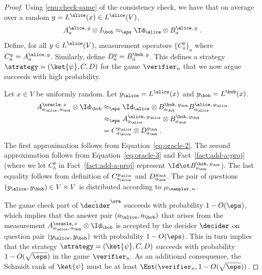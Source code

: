 \begin{proof}
  Using \cref{enu:check-same} of the consistency check, we have that on
  average over a random $y = L^\alice(x) \in L^\alice(V)$,
  \begin{equation}
    \label{eq:oracle-3}
    A^{\alice,\, y}_{a} \otimes I_\bob \approx_\eps
    \Id_\alice \otimes B^{\alice,\, y}_{a}\;.
  \end{equation}
  Define, for all $y \in L^\alice(V)$, measurement operators $\{C^y_a\}_a$ where
  $C^y_a = A^{\alice,\, y}_a$.
  Similarly, define $D^y_a = B^{\bob,\, y}_a$.
  This defines a strategy $\strategy = (\ket{\psi},C,D)$ for the game
  $\verifier_n$ that we now argue succeeds with high probability.
    
  Let $x \in V$ be uniformly random.
  Let $y_\alice = L^\alice(x)$ and $y_\bob =L^\bob(x)$.
  \begin{align*}
    A^{\oracle,\, x}_{a_\alice,\, a_\bob} \otimes \Id_\bob
    & \approx_\eps \Id_\alice \otimes
      B^{\bob,\, y_\bob}_{a_\bob} B^{\alice,\, y_\alice}_{a_\alice} \\
    & \approx_{\eps} A^{\alice,\, y_\alice}_{a_\alice} \otimes
      B^{\bob,\, y_\bob}_{a_\bob} \\
    & = C^{y_\alice}_{a_\alice} \otimes D^{y_\bob}_{a_\bob}\;.
  \end{align*}
	The first approximation follows from Equation~\eqref{eq:oracle-2}.
  The second approximation follows from Equation~\eqref{eq:oracle-3} and
  Fact~\ref{fact:add-a-proj} (where we let $C^y_b$ in Fact~\ref{fact:add-a-proj}
  represent $\Id\ot B^{\bob,\, y_\bob}_{a_\bob}$).
  The last equality follows from definition of $C^{y_\alice}_{a_\alice}$ and
  $D^{y_\bob}_{a_\bob}$.
  The pair of questions $(y_\alice, y_\bob) \in V \times V$ is distributed
  according to $\mu_{\sampler,\, n}$.

  The game check part of $\tdora$ succeeds with probability $1 -
  O(\eps)$, which implies that the answer pair $(a_\alice, a_\bob)$ that arises
  from the measurement $A^{\oracle,\, x}_{a_\alice,\, a_\bob} \otimes \Id_\bob$
  is accepted by the decider $\decider$ on question pair $(y_\alice,y_\bob)$
  with probability $1 - O(\eps)$.
  This in turn implies that the strategy $\strategy = (\ket{\psi},C,D)$ succeeds
  with probability $1 - O(\sqrt{\eps})$ in the game $\verifier_n$.
  As an additional consequence, the Schmidt rank of $\ket{\psi}$ must be at
  least $\Ent(\verifier_n, 1 - O(\sqrt{\eps}))$.
\end{proof}

 
